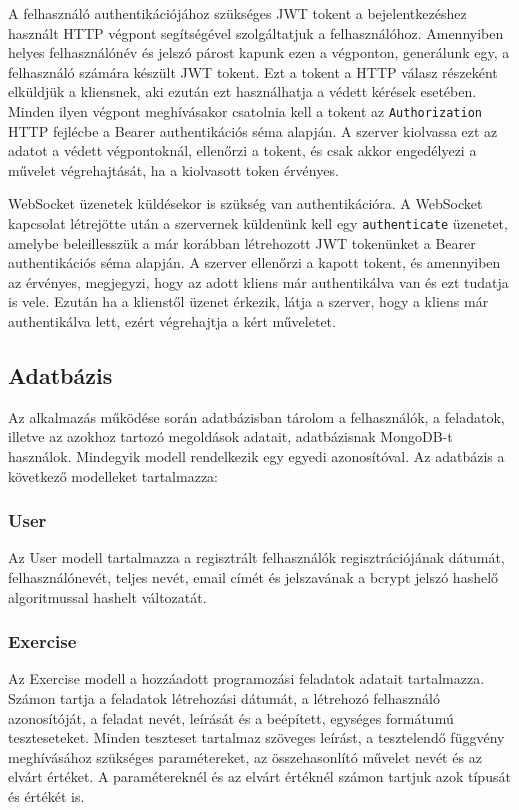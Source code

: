 \documentclass{elteikthesis}
\begin{document}
				A felhasználó authentikációjához szükséges JWT tokent a bejelentkezéshez használt HTTP végpont segítségével szolgáltatjuk a felhasználóhoz. Amennyiben helyes felhasználónév és jelszó párost kapunk ezen a végponton, generálunk egy, a felhasználó számára készült JWT tokent. Ezt a tokent a HTTP válasz részeként elküldjük a kliensnek, aki ezután ezt használhatja a védett kérések esetében. Minden ilyen végpont meghívásakor csatolnia kell a tokent az \texttt{Authorization} HTTP fejlécbe a Bearer authentikációs séma alapján. A szerver kiolvassa ezt az adatot a védett végpontoknál, ellenőrzi a tokent, és csak akkor engedélyezi a művelet végrehajtását, ha a kiolvasott token érvényes.

				WebSocket üzenetek küldésekor is szükség van authentikációra. A WebSocket kapcsolat létrejötte után a szervernek küldenünk kell egy \texttt{authenticate} üzenetet, amelybe beleillesszük a már korábban létrehozott JWT tokenünket a Bearer authentikációs séma alapján. A szerver ellenőrzi a kapott tokent, és amennyiben az érvényes, megjegyzi, hogy az adott kliens már authentikálva van és ezt tudatja is vele. Ezután ha a klienstől üzenet érkezik, látja a szerver, hogy a kliens már authentikálva lett, ezért végrehajtja a kért műveletet.
			
			\subsection{Adatbázis}
				Az alkalmazás működése során adatbázisban tárolom a felhasználók, a feladatok, illetve az azokhoz tartozó megoldások adatait, adatbázisnak MongoDB-t használok. Mindegyik modell rendelkezik egy egyedi azonosítóval. Az adatbázis a következő modelleket tartalmazza:

				\subsubsection{User} 
					Az User modell tartalmazza a regisztrált felhasználók regisztrációjának dátumát, felhasználónevét, teljes nevét, email címét és jelszavának a bcrypt jelszó hashelő algoritmussal hashelt változatát.

				\subsubsection{Exercise}
					Az Exercise modell a hozzáadott programozási feladatok adatait tartalmazza. Számon tartja a feladatok létrehozási dátumát, a létrehozó felhasználó azonosítóját, a feladat nevét, leírását és a beépített, egységes formátumú teszteseteket. Minden teszteset tartalmaz szöveges leírást, a tesztelendő függvény meghívásához szükséges paramétereket, az összehasonlító művelet nevét és az elvárt értéket. A paramétereknél és az elvárt értéknél számon tartjuk azok típusát és értékét is.
\end{document}

